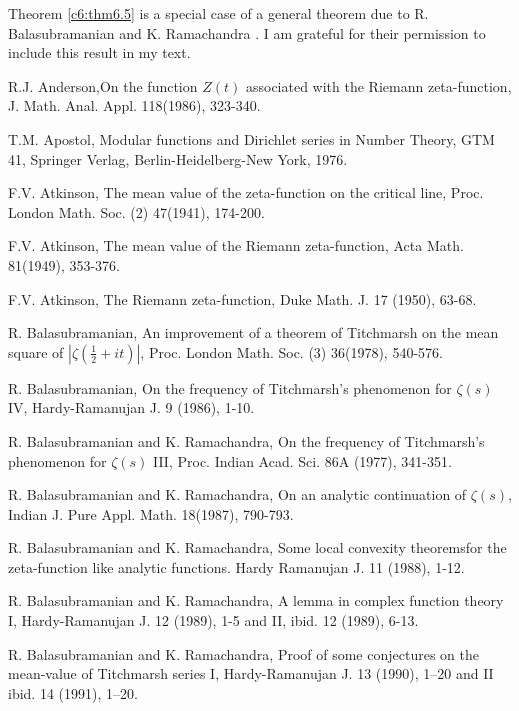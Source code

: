 Theorem \ref{c6:thm6.5} is a special case of a general theorem due to
R. Balasubramanian and K. Ramachandra \cite{Balasubramanian and
  Ramachandra5}. I am grateful for their permission to include this
result in my text. 

\begin{thebibliography}{99}
 R.J. Anderson,\pageoriginale On the function $Z(t)$ associated with the Riemann zeta-function, J. Math. Anal. Appl. 118(1986), 323-340.

 T.M. Apostol, Modular functions and Dirichlet series in Number Theory, GTM 41, Springer Verlag, Berlin-Heidelberg-New York, 1976.

 F.V. Atkinson, The mean value of the zeta-function on the critical line, Proc. London Math. Soc. (2) 47(1941), 174-200.

 F.V. Atkinson, The mean value of the Riemann zeta-function, Acta Math. 81(1949), 353-376.

 F.V. Atkinson, The Riemann zeta-function, Duke Math. J. 17 (1950), 63-68.

 R. Balasubramanian, An improvement of a theorem of Titchmarsh on the mean square of $|\zeta(\frac{1}{2} + it)|$, Proc. London Math. Soc. (3) 36(1978), 540-576.

 R. Balasubramanian, On the frequency of Titchmarsh's phenomenon for $\zeta(s)$ IV, Hardy-Ramanujan J. 9 (1986), 1-10.

 R. Balasubramanian and K. Ramachandra, On the frequency of Titchmarsh's phenomenon for $\zeta(s)$ III, Proc. Indian Acad. Sci. 86A (1977), 341-351.

 R. Balasubramanian and K. Ramachandra, On an analytic continuation of $\zeta(s)$, Indian J. Pure Appl. Math. 18(1987), 790-793.

 R. Balasubramanian and K. Ramachandra, Some local convexity theorems\pageoriginale for the zeta-function like analytic functions. Hardy Ramanujan J. 11 (1988), 1-12.

 R. Balasubramanian and K. Ramachandra, A lemma in complex function theory I, Hardy-Ramanujan J. 12 (1989), 1-5 and II, ibid. 12 (1989), 6-13.

  R. Balasubramanian and K. Ramachandra, Proof of some conjectures on the mean-value of Titchmarsh series I, Hardy-Ramanujan J. 13 (1990), 1--20 and II ibid. 14 (1991), 1--20.


\end{thebibliography}
